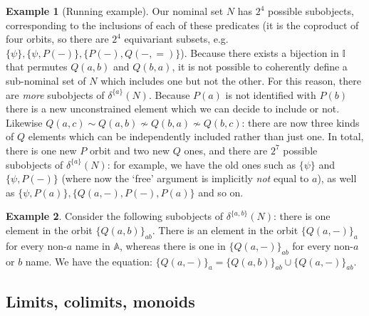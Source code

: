 \documentclass{article}
\theoremstyle{definition}
\newtheorem{example}{Example}[section]
\newcommand{\A}{\mathbb{A}}
\newcommand{\II}{\mathbb{I}}
\begin{document}
\begin{example}[Running example]
    \label{ex:subobj}
    Our nominal set $N$ has $2^4$ possible subobjects, corresponding to the inclusions of each of these predicates (it is the coproduct of four orbits, so there are $2^4$ equivariant subsets, e.g. $\{\psi\}, \{\psi,P(-)\},\{P(-),Q(-,=)\}$). 
    Because there exists a bijection in $\II$ that permutes $Q(a,b)$ and $Q(b,a)$, it is not possible to coherently define a sub-nominal set of $N$ which includes one but not the other. 
    For this reason, there are {\it more} subobjects of $\delta^{\{a\}}(N)$. 
    Because $P(a)$ is not identified with $P(b)$ there is a new unconstrained element which we can decide to include or not. 
    Likewise $Q(a,c)\sim Q(a,b)\nsim Q(b,a)\nsim Q(b,c)$: there are now three kinds of $Q$ elements which can be independently included rather than just one. 
    In total, there is one new $P$ orbit and two new $Q$ ones, and there are $2^7$ possible subobjects of $\delta^{\{a\}}(N)$: for example, we have the old ones such as $\{\psi\}$ and $\{\psi, P(-)\}$ (where now the `free' argument is implicitly {\it not} equal to $a$), as well as $\{\psi,P(a)\}, \{Q(a,-),P(-),P(a)\}$ and so on.
\end{example}

\begin{example}
    Consider the following subobjects of $\delta^{\{a,b\}}(N)$: there is one element in the orbit $\{Q(a,b)\}_{ab}$. There is an element in the orbit $\{Q(a,-)\}_a$ for every non-$a$ name in $\A$, whereas there is one in $\{Q(a,-)\}_{ab}$ for every non-$a$ or $b$ name. We have the equation: $\{Q(a,-)\}_a = \{Q(a,b)\}_{ab} \cup \{Q(a,-)\}_{ab}$.
\end{example}

\subsection*{Limits, colimits, monoids}
\end{document}
